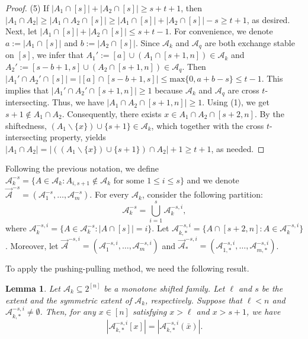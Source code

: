 \documentclass[11pt,a4paper]{article}
\newtheorem{lemma}[theorem]{Lemma}
\begin{document}
\begin{proof}
(5) If $|A_1\cap [s]|+|A_2\cap [s]|\geq  s+t+1$, then $|A_1\cap A_2|\geq  |A_1\cap A_2\cap [s]|\geq  |A_1\cap [s]|+|A_2\cap [s]|-s\geq  t+1$, as desired. Next, let $|A_1\cap [s]|+|A_2\cap [s]|\leq s+t-1$. For convenience, we denote $a:=|A_1\cap [s]|$ and $b:=|A_2\cap [s]|$.
Since $\mathcal{A}_k$  and $\mathcal{A}_q$ are both exchange stable on $[s]$, we infer that $A_1':=[a]\cup (A_1\cap[s+1, n])\in \mathcal{A}_k$
and  $A_2':=[s-b+1, s]\cup (A_2\cap[s+1, n])\in \mathcal{A}_q$.
Then $|A_1'\cap A_2'\cap [s]|=|[a]\cap [s-b+1,s]|\leq \text{max}\{0, a+b-s\}\leq t-1$. This implies that $|A_1'\cap A_2'\cap [s+1,n]|\geq  1$ because $\mathcal{A}_k$  and $\mathcal{A}_q$ are cross $t$-intersecting. 
Thus, we have $|A_1\cap A_2\cap [s+1,n]|\geq  1$. Using (1), we get $s+1\notin  A_1\cap A_2$. Consequently, there exists $x\in A_1\cap A_2\cap [s+2,n]$.
By the shiftedness, $(A_1\backslash\{x\}) \cup\{s+1\}\in \mathcal{A}_k$, which together with the cross $t$-intersecting property, yields
$|A_1\cap A_2|=|((A_1\backslash\{x\}) \cup\{s+1\})\cap A_2|+1\geq  t+1$, as needed. 
\end{proof}

Following the previous notation, we define $\mathcal{A}_k^{-s} = \{ A \in \mathcal{A}_k: A_{i,s+1} \notin \mathcal{A}_k \text{ for some } 1 \leq i \leq s \}
$ and we denote 
$\vec{\mathcal{A}}^{-s} = (\mathcal{A}_1^{-s}, \ldots, \mathcal{A}_m^{-s})$. 
For every $\mathcal{A}_k$, consider the following partition:
$$
\mathcal{A}_{k}^{-s}=\bigcup_{i=1}^{s}\mathcal{A}_{k}^{-s, i}, 
$$
where $\mathcal{A}_{k}^{-s,i}=\{A\in\mathcal{A}_{k}^{-s}: |A\cap[s]|=i \}$. 
Let $\mathcal{A}_{k,*}^{-s, i}=\{A\cap [s+2, n]: A\in \mathcal{A}_{k}^{-s,i}\}$.  Moreover, let
 $\vec{\mathcal{A}}^{-s,i} = (\mathcal{A}_1^{-s,i}, \ldots, \mathcal{A}_m^{-s,i})$ and $\vec{\mathcal{A}}_*^{-s,i} = (\mathcal{A}_{1,*}^{-s,i}, \ldots, \mathcal{A}_{m,*}^{-s,i})$.




To apply the pushing-pulling method, we need the following result.

\begin{lemma}\label{le32}
Let $\mathcal A_k\subseteq 2^{[n]}$ be a monotone
shifted family. Let $\ell$ and $s$ be the extent and the symmetric
extent of $\mathcal A_k$, respectively. Suppose that $\ell<n$ and
$\mathcal A_{k,*}^{-s,i}\ne\emptyset$. Then, for any $x\in[n]$
satisfying
$
x>\ell$ and $ x>s+1$,
we have
\[ \left|\mathcal{A}_{k,*}^{-s,i}[x] \right|= 
\left|\mathcal{A}_{k,*}^{-s,i}(\bar{x}) \right|. \]
\end{lemma} 
\end{document}
